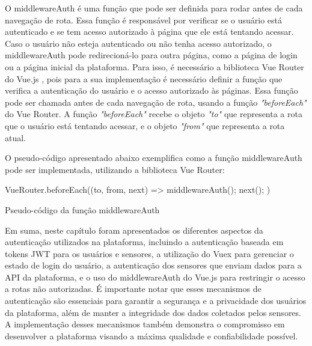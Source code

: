 \documentclass[tcc,capa]{texufpel}
\begin{document}
O middlewareAuth é uma função que pode ser definida para rodar antes de cada navegação de rota. Essa função é responsável por verificar se o usuário está autenticado e se tem acesso autorizado à página que ele está tentando acessar. Caso o usuário não esteja autenticado ou não tenha acesso autorizado, o middlewareAuth pode redirecioná-lo para outra página, como a página de login ou a página inicial da plataforma. Para isso, é necessário a biblioteca Vue Router do Vue.js \cite{vue:2014}, pois para a sua implementação é necessário definir a função que verifica a autenticação do usuário e o acesso autorizado às páginas. Essa função pode ser chamada antes de cada navegação de rota, usando a função \textit{"beforeEach"} do Vue Router. A função \textit{"beforeEach"} recebe o objeto \textit{"to"} que representa a rota que o usuário está tentando acessar, e o objeto \textit{"from"} que representa a rota atual.

O pseudo-código apresentado abaixo exemplifica como a função middlewareAuth pode ser implementada, utilizando a biblioteca Vue Router:\\

\begin{algorithm}[H]
\SetAlgoLined
{}

VueRouter.beforeEach((to, from, next) => {
middlewareAuth();
next();
})
\caption{Pseudo-código da função middlewareAuth}
\end{algorithm}
\hfill\break


Em suma, neste capítulo foram apresentados os diferentes aspectos da autenticação utilizados na plataforma, incluindo a autenticação baseada em tokens JWT para os usuários e sensores, a utilização do Vuex para gerenciar o estado de login do usuário, a autenticação dos sensores que enviam dados para a API da plataforma, e o uso do middlewareAuth do Vue.js \cite{vue:2014} para restringir o acesso a rotas não autorizadas. É importante notar que esses mecanismos de autenticação são essenciais para garantir a segurança e a privacidade dos usuários da plataforma, além de manter a integridade dos dados coletados pelos sensores. A implementação desses mecanismos também demonstra o compromisso em desenvolver a plataforma visando a máxima qualidade e confiabilidade possível.
\end{document}
